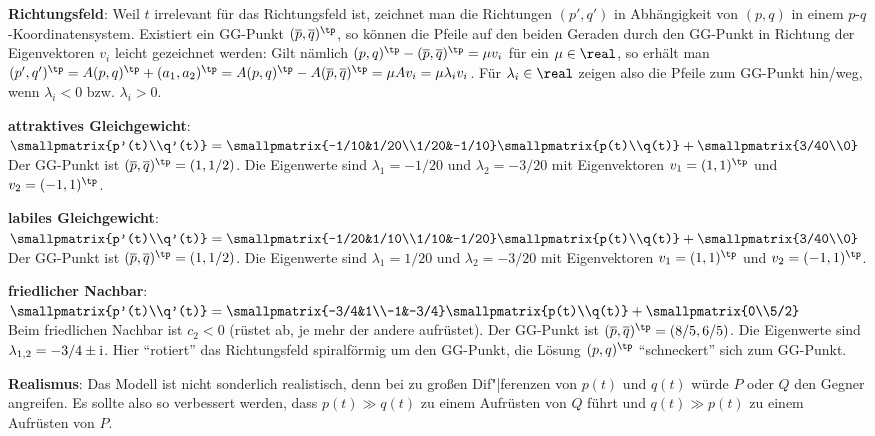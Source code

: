 \textbf{Richtungsfeld}:
Weil $t$ irrelevant für das Richtungsfeld ist, zeichnet man die Richtungen $(p', q')$ in
Abhängigkeit von $(p, q)$ in einem $p$-$q$-Koordinatensystem.
Existiert ein GG-Punkt $(\overline{p}, \overline{q})^\tp$,
so können die Pfeile auf den beiden Geraden durch den GG-Punkt in Richtung der Eigenvektoren $v_i$
leicht gezeichnet werden:
Gilt nämlich $(p, q)^\tp - (\overline{p}, \overline{q})^\tp = \mu v_i$ für ein $\mu \in \real$,
so erhält man
$(p', q')^\tp = A(p, q)^\tp + (a_1, a_2)^\tp = A(p, q)^\tp - A(\overline{p}, \overline{q})^\tp
= \mu Av_i = \mu \lambda_i v_i$.
Für $\lambda_i \in \real$ zeigen also die Pfeile zum GG-Punkt hin/weg, wenn $\lambda_i < 0$ bzw.
$\lambda_i > 0$.

\linie

\textbf{attraktives Gleichgewicht}:
$\smallpmatrix{p'(t)\\q'(t)} =
\smallpmatrix{-1/10&1/20\\1/20&-1/10} \smallpmatrix{p(t)\\q(t)} + \smallpmatrix{3/40\\0}$\\
Der GG-Punkt ist $(\overline{p}, \overline{q})^\tp = (1, 1/2)$.
Die Eigenwerte sind $\lambda_1 = -1/20$ und $\lambda_2 = -3/20$ mit Eigenvektoren
$v_1 = (1, 1)^\tp$ und $v_2 = (-1, 1)^\tp$.

\textbf{labiles Gleichgewicht}:
$\smallpmatrix{p'(t)\\q'(t)} =
\smallpmatrix{-1/20&1/10\\1/10&-1/20} \smallpmatrix{p(t)\\q(t)} + \smallpmatrix{3/40\\0}$\\
Der GG-Punkt ist $(\overline{p}, \overline{q})^\tp = (1, 1/2)$.
Die Eigenwerte sind $\lambda_1 = 1/20$ und $\lambda_2 = -3/20$ mit Eigenvektoren
$v_1 = (1, 1)^\tp$ und $v_2 = (-1, 1)^\tp$.

\textbf{friedlicher Nachbar}:
$\smallpmatrix{p'(t)\\q'(t)} =
\smallpmatrix{-3/4&1\\-1&-3/4} \smallpmatrix{p(t)\\q(t)} + \smallpmatrix{0\\5/2}$\\
Beim friedlichen Nachbar ist $c_2 < 0$ (rüstet ab, je mehr der andere aufrüstet).
Der GG-Punkt ist $(\overline{p}, \overline{q})^\tp = (8/5, 6/5)$.
Die Eigenwerte sind $\lambda_{1,2} = -3/4 \pm \text{i}$.
Hier "`rotiert"' das Richtungsfeld spiralförmig um den GG-Punkt,
die Lösung $(p, q)^\tp$ "`schneckert"' sich zum GG-Punkt.

\linie

\textbf{Realismus}:
Das Modell ist nicht sonderlich realistisch, denn bei zu großen Dif"|ferenzen von $p(t)$ und $q(t)$
würde $P$ oder $Q$ den Gegner angreifen.
Es sollte also so verbessert werden, dass $p(t) \gg q(t)$ zu einem Aufrüsten von $Q$ führt
und $q(t) \gg p(t)$ zu einem Aufrüsten von $P$.

\pagebreak
